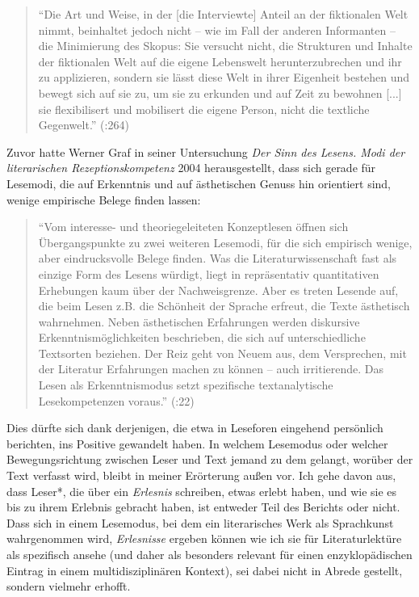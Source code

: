 \documentclass[fontsize=12pt]{scrartcl}
\begin{document}
\singlespacing
\begin{quote}
"`Die Art und Weise, in der [die Interviewte] Anteil an der fiktionalen Welt nimmt, beinhaltet jedoch nicht -- wie im Fall der anderen Informanten -- die Minimierung des Skopus: Sie versucht nicht, die Strukturen und Inhalte der fiktionalen Welt auf die eigene Lebenswelt herunterzubrechen und ihr zu applizieren, sondern sie l\"asst diese Welt in ihrer Eigenheit bestehen und bewegt sich auf sie zu, um sie zu erkunden und \flq auf Zeit\frq\,\,zu bewohnen [...] sie flexibilisert und mobilisert die eigene Person, nicht die textliche Gegenwelt."' (\cite{Dawidowski2009}:264)
\end{quote} 
\onehalfspacing

Zuvor hatte Werner Graf in seiner Untersuchung \textit{Der Sinn des Lesens. Modi der li\-te\-ra\-rischen Rezeptionskompetenz} 2004 he\-rausgestellt, dass sich gerade f\"ur Lesemodi, die auf Erkenntnis und auf \"asthetischen Genuss hin orientiert sind, wenige empirische Belege finden lassen: 

\singlespacing
\begin{quote}
"`Vom interesse- und theoriegeleiteten Konzeptlesen \"offnen sich \"Uber\-gangs\-punk\-te zu zwei weiteren Lesemodi, f\"ur die sich empirisch wenige, aber eindrucksvolle Belege finden. Was die Li\-te\-ra\-tur\-wissenschaft fast als einzige Form des Lesens w\"urdigt, liegt in repr\"asentativ quantitativen Erhebungen kaum \"uber der Nachweisgrenze. Aber es treten Lesende auf, die beim Lesen z.B. die Sch\"onheit der Sprache erfreut, die Texte \"asthetisch wahrnehmen. Neben \"asthetischen Erfah\-rungen werden diskursive Erkenntnism\"oglichkeiten beschrieben, die sich auf unterschiedliche Textsorten beziehen. Der Reiz geht von Neuem aus, dem Versprechen, mit der Li\-te\-ra\-tur Erfah\-rungen machen zu k\"onnen -- auch irritierende. Das Lesen als Erkenntnismodus setzt spezifische textana\-lytische Lesekompetenzen voraus."' (\cite{Graf2004}:22)
\end{quote} 
\onehalfspacing

Dies d\"urfte sich dank derjenigen, die etwa in Leseforen eingehend pers\"onlich berichten, ins Positive gewandelt haben. In welchem Lesemodus oder welcher Bewegungsrichtung zwischen Leser\textsuperscript{\tiny *} und Text jemand zu dem gelangt, wor\"uber der Text verfasst wird, bleibt in meiner Er\"orterung au{\ss}en vor. Ich gehe davon aus, dass Leser*, die \"uber ein \textit{Erlesnis} schrei\-ben, etwas erlebt haben, und wie sie es bis zu ihrem Erlebnis gebracht haben, ist entweder Teil des Berichts oder nicht. Dass sich in einem Lesemodus, bei dem ein li\-te\-ra\-risches Werk als Sprachkunst wahrgenommen wird, \textit{Erlesnisse} ergeben k\"onnen wie ich sie f\"ur Li\-te\-ra\-tur\-lekt\"ure als spezifisch ansehe (und daher als besonders relevant f\"ur einen enzy\-klop\"adischen Eintrag in einem multidisziplin\"aren Kontext), sei dabei nicht in Abrede gestellt, sondern vielmehr erhofft.
\end{document}
